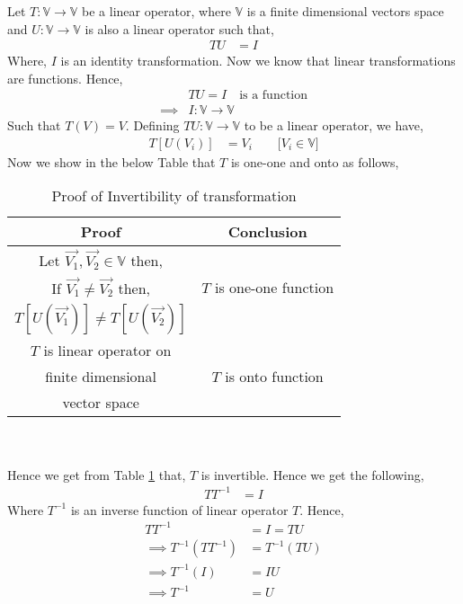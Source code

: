Let $T:\mathbb{V} \xrightarrow{} \mathbb{V}$ be a linear operator, where $\mathbb{V}$ is a finite dimensional vectors space and $U:\mathbb{V} \xrightarrow{} \mathbb{V}$ is also a linear operator such that,
\begin{align}
TU &= I
\end{align}
Where, $I$ is an identity transformation. Now we know that linear transformations are functions. Hence,
\begin{align}
&TU = I \quad{\text{is a function}}\\
\implies& I :\mathbb{V}\xrightarrow{}\mathbb{V}
\end{align}
Such that $T(V) = V$. Defining $TU :\mathbb{V}\xrightarrow{}\mathbb{V}$ to be a linear operator, we have,
\begin{align}
T[U(V_i)] &= V_i \qquad{\text{[$V_i \in \mathbb{V}$]}}
\end{align}
Now we show in the below Table that $T$ is one-one and onto as follows,\\
\begin{table}[h!]
\centering
\begin{tabular}{|c|c|} \hline
\textbf{Proof} & \textbf{Conclusion}  \\ \hline
Let $\vec{V_1},\vec{V_2} \in \mathbb{V}$ then, &
         \\If $\vec{V_1} \ne \vec{V_2}$ then, & $T$ is one-one function
         \\$T[U(\vec{V_1})] \ne T[U(\vec{V_2})]$
&  \\ \hline
$T$ is linear operator on & 
          \\finite dimensional & $T$ is onto function 
          \\ vector space
& \\\hline
\end{tabular}
\caption{Proof of Invertibility of transformation}
\label{eq:solutions/3/3/9/tab:invert}
\end{table}\\
\\Hence we get from Table \ref{eq:solutions/3/3/9/tab:invert} that, $T$ is invertible.
Hence we get the following,
\begin{align}
TT^{-1} &= I
\end{align}
Where $T^{-1}$ is an inverse function of linear operator $T$. Hence,
\begin{align}
TT^{-1} &= I = TU\\
\implies T^{-1}(TT^{-1}) &= T^{-1}(TU)\\
\implies T^{-1}(I) &= IU\\
\implies T^{-1} &= U\label{eq:solutions/3/3/9/proof}
\end{align}
